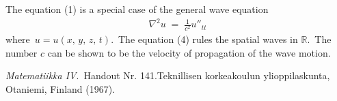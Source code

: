 \documentclass[12pt]{article}
\theoremstyle{definition}
\begin{document}
The equation (1) is a special case of the general wave equation
\begin{align}
\nabla^2u \;=\; \frac{1}{c^2}u''_{tt}
\end{align}
where\, $u =u(x,\,y,\,z,\,t)$.\, The equation (4) rules the spatial waves in $\mathbb{R}$.\, The number $c$ can be shown to be the velocity of propagation of the wave motion.

\begin{thebibliography}{9}
 {\em Matematiikka IV}.\, Handout Nr. 141.\quad Teknillisen korkeakoulun ylioppilaskunta, Otaniemi, Finland (1967).
\end{thebibliography}
\end{document}
